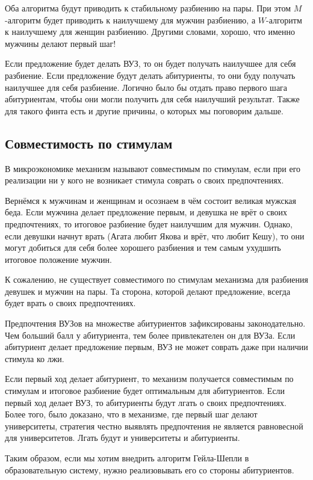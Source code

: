 \documentclass[pdftex, 11pt, a4paper]{article}
\begin{document}
Оба алгоритма будут приводить к стабильному разбиению на пары. При этом $M$-алгоритм будет приводить к наилучшему для мужчин разбиению, а $W$-алгоритм к наилучшему для женщин разбиению. Другими словами, хорошо, что именно мужчины делают первый шаг!  

Если предложение будет делать ВУЗ, то он будет получать наилучшее для себя разбиение. Если предложение будут делать абитуриенты, то они буду получать наилучшее для себя разбиение. Логично было бы отдать право первого шага абитуриентам, чтобы они могли получить для себя наилучший результат. Также для такого финта есть и другие причины, о которых мы поговорим дальше. 

\subsection*{Совместимость по стимулам} 

В микроэкономике механизм называют совместимым по стимулам, если при его реализации ни у кого не возникает стимула соврать о своих предпочтениях. 

Вернёмся к мужчинам и женщинам и осознаем в чём состоит великая мужская беда. Если мужчина делает предложение первым, и девушка не врёт о своих предпочтениях, то итоговое разбиение будет наилучшим для мужчин. Однако, если девушки начнут врать (Агата любит Якова и врёт, что любит Кешу), то они могут добиться для себя более хорошего разбиения и тем самым ухудшить итоговое положение мужчин.

К сожалению, не существует совместимого по стимулам механизма для разбиения девушек и мужчин на пары. Та сторона, которой делают предложение, всегда будет врать о своих предпочтениях. 

Предпочтения ВУЗов на множестве абитуриентов зафиксированы законодательно. Чем больший балл у абитуриента, тем более привлекателен он для ВУЗа. Если абитуриент делает предложение первым, ВУЗ не может соврать даже при наличии стимула ко лжи. 

Если первый ход делает абитуриент, то механизм получается совместимым по стимулам и итоговое разбиение будет оптимальным для абитуриентов. Если первый ход делает ВУЗ, то абитуриенты будут лгать о своих предпочтениях. Более того, было доказано, что в механизме, где первый шаг делают университеты, стратегия честно выявлять предпочтения не является равновесной для университетов. Лгать будут и университеты и абитуриенты.

Таким образом, если мы хотим внедрить алгоритм Гейла-Шепли в образовательную систему, нужно реализовывать его со стороны абитуриентов. 
\end{document}
